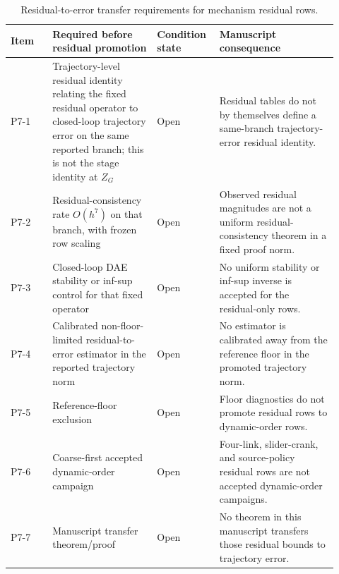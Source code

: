 \documentclass[preprint,12pt]{elsarticle}
\begin{document}
\begin{table}[htbp]
\centering
\caption{Residual-to-error transfer requirements for mechanism residual rows.}
\label{tab:p7-residual-to-error-obligation-ledger}
\scriptsize
\setlength{\tabcolsep}{2pt}
\renewcommand{\arraystretch}{0.9}
\begin{tabular}{P{0.12\linewidth}P{0.30\linewidth}P{0.16\linewidth}P{0.34\linewidth}}
\toprule
Item & Required before residual promotion & Condition state & Manuscript consequence \\
\midrule
P7-1 & Trajectory-level residual identity relating the fixed residual operator
to closed-loop trajectory error on the same reported branch; this is not the
stage identity at \(Z_G\) & Open &
Residual tables do not by themselves define a same-branch trajectory-error
residual identity. \\
P7-2 & Residual-consistency rate \(O(h^7)\) on that branch, with frozen row
scaling & Open &
Observed residual magnitudes are not a uniform residual-consistency theorem in
a fixed proof norm. \\
P7-3 & Closed-loop DAE stability or inf-sup control for that fixed operator &
Open &
No uniform stability or inf-sup inverse is accepted for the residual-only
rows. \\
P7-4 & Calibrated non-floor-limited residual-to-error estimator in the reported
trajectory norm & Open &
No estimator is calibrated away from the reference floor in the promoted
trajectory norm. \\
P7-5 & Reference-floor exclusion & Open &
Floor diagnostics do not promote residual rows to dynamic-order rows. \\
P7-6 & Coarse-first accepted dynamic-order campaign & Open &
Four-link, slider-crank, and source-policy residual rows are not accepted
dynamic-order campaigns. \\
P7-7 & Manuscript transfer theorem/proof & Open &
No theorem in this manuscript transfers those residual bounds to trajectory
error. \\
\bottomrule
\end{tabular}
\end{table}
\end{document}
